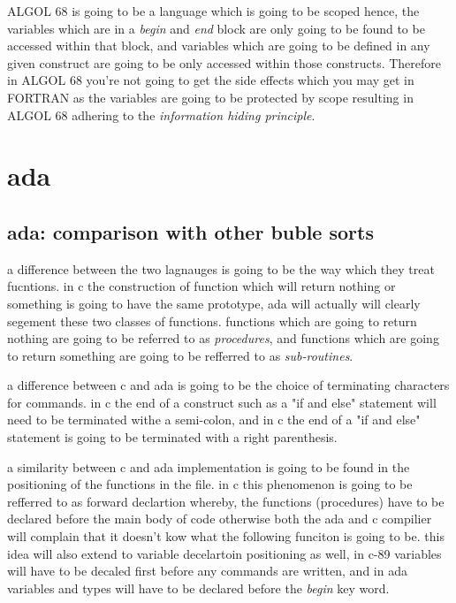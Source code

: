 \documentclass[
	12pt, %
]{fphw}
\begin{document}
ALGOL 68 is going to be a language which is going to be scoped hence, the
variables which are in a \emph{begin} and \emph{end} block are only going to be
found to be accessed within that block, and variables which are going to be defined
in any given construct are going to be only accessed within those constructs.
Therefore in ALGOL 68 you're not going to get the side effects which you may get in
FORTRAN as the variables are going to be protected by scope resulting in ALGOL 68
adhering to the \emph{information hiding principle}. \par

\section{ada}
\subsection{ada: comparison with other buble sorts}
a difference between the two lagnauges is going to be the way which they treat
fucntions. in c the construction of function which will return nothing or something
is going to have the same prototype, ada will actually will clearly segement these
two classes of functions. functions which are going to return nothing are going
to be referred to as \emph{procedures}, and functions which are going to return
something are going to be refferred to as \emph{sub-routines}. \par

a difference between c and ada is going to be the choice of terminating characters
for commands. in c the end of a construct such as a "if and else" statement will
need to be terminated withe a semi-colon, and in c the end of a "if and else"
statement is going to be terminated with a right parenthesis.\par

a similarity between c and ada implementation is going to be found in the
positioning of the functions in the file. in c this phenomenon is going to be
refferred to as forward declartion whereby, the functions (procedures) have to
be declared before the main body of code otherwise both the ada and c compilier
will complain that it doesn't kow what the following funciton is going to be. this
idea will also extend to variable decelartoin positioning as well, in c-89
variables will have to be decaled first before any commands are written, and in
ada variables and types will have to be declared before the \emph{begin} key word.\par
\end{document}
